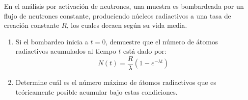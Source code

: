 \item En el análisis por activación de neutrones, una muestra es bombardeada por un flujo de neutrones constante, produciendo núcleos radiactivos a una tasa de creación constante $R$, los cuales decaen según su vida media.
\begin{enumerate}
    \item Si el bombardeo inicia a $t = 0$, demuestre que el número de átomos radiactivos acumulados al tiempo $t$ está dado por:
    $$ N(t) = \frac{R}{\lambda} \left( 1 - e^{-\lambda t} \right) $$
    \item Determine cuál es el número máximo de átomos radiactivos que es teóricamente posible acumular bajo estas condiciones.
\end{enumerate}